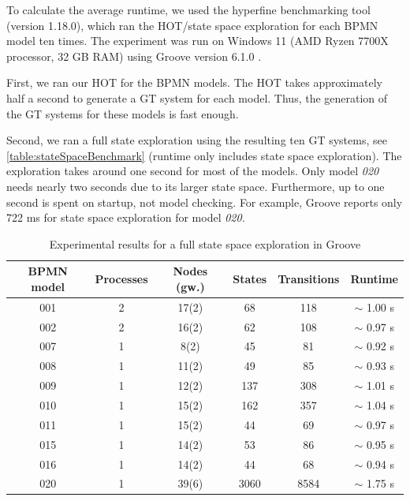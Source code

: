 \documentclass{lmcs} %
\begin{document}
To calculate the average runtime, we used the hyperfine benchmarking tool \cite{peterHyperfine2023} (version 1.18.0), which ran the HOT/state space exploration for each BPMN model ten times.
The experiment was run on Windows 11 (AMD Ryzen 7700X processor, 32 GB RAM) using Groove version 6.1.0 \cite{timkrauterLMCS2024Artifacts2023}.

First, we ran our HOT for the BPMN models.
The HOT takes approximately half a second to generate a GT system for each model.
Thus, the generation of the GT systems for these models is fast enough.

Second, we ran a full state exploration using the resulting ten GT systems, see \autoref{table:stateSpaceBenchmark} (runtime only includes state space exploration).
The exploration takes around one second for most of the models.
Only model \textit{020} needs nearly two seconds due to its larger state space.
Furthermore, up to one second is spent on startup, not model checking.
For example, Groove reports only 722 ms for state space exploration for model \textit{020}.

\begin{table}[ht]
\centering
\caption{Experimental results for a full state space exploration in Groove}

\begin{tabular}{| c | c | c || c | c | c |}
 \hline
 BPMN model & Processes & Nodes (gw.) & States & Transitions & Runtime \\
 \hline\hline
 001 & 2 & 17(2) & 68 & 118 & $\sim$ 1.00 s \\
 \hline
 002 & 2 & 16(2) & 62 & 108 & $\sim$ 0.97 s \\
 \hline
 007 & 1 & 8(2) & 45 & 81 & $\sim$ 0.92 s \\
 \hline
 008 & 1 & 11(2) & 49 & 85 & $\sim$ 0.93 s \\
 \hline
 009 & 1 & 12(2) & 137 & 308 & $\sim$ 1.01 s \\
 \hline
 010 & 1 & 15(2) & 162 & 357 & $\sim$ 1.04 s \\
 \hline
 011 & 1 & 15(2) & 44 & 69 & $\sim$ 0.97 s \\
 \hline
 015 & 1 & 14(2) & 53 & 86 & $\sim$ 0.95 s \\
 \hline
 016 & 1 & 14(2) & 44 & 68 & $\sim$ 0.94 s \\
 \hline
 020 & 1 & 39(6) & 3060 & 8584 & $\sim$ 1.75 s \\
 \hline
\end{tabular}
\label{table:stateSpaceBenchmark}
\end{table}
\end{document}
